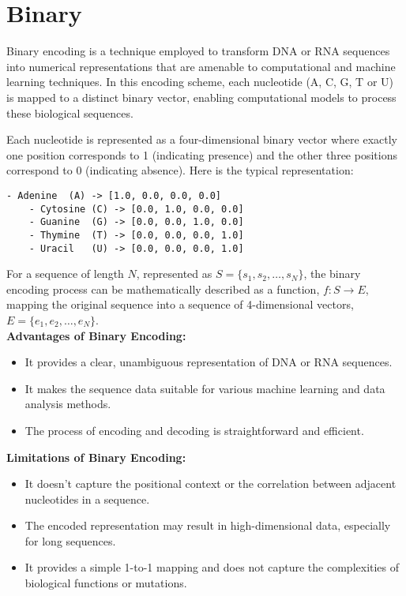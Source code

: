\section{Binary}
Binary encoding is a technique employed to transform DNA or RNA sequences into 
numerical representations that are amenable to computational and machine learning 
techniques. In this encoding scheme, each nucleotide (A, C, G, T or U) is mapped 
to a distinct binary vector, enabling computational models to process these biological 
sequences.

Each nucleotide is represented as a four-dimensional binary vector where exactly 
one position corresponds to 1 (indicating presence) and the other three positions 
correspond to 0 (indicating absence). Here is the typical representation:

\begin{lstlisting}[basicstyle=\ttfamily]
    - Adenine  (A) -> [1.0, 0.0, 0.0, 0.0]
    - Cytosine (C) -> [0.0, 1.0, 0.0, 0.0]
    - Guanine  (G) -> [0.0, 0.0, 1.0, 0.0]
    - Thymine  (T) -> [0.0, 0.0, 0.0, 1.0]
    - Uracil   (U) -> [0.0, 0.0, 0.0, 1.0]
\end{lstlisting}

\noindent
For a sequence of length $N$, represented as $S = \{s_1, s_2, \ldots, s_N\}$, the 
binary encoding process can be mathematically described as a function, 
$f: S \rightarrow E$, mapping the original sequence into a sequence of 
4-dimensional vectors, $E = \{e_1, e_2, \ldots, e_N\}$.\\

\noindent
\textbf{Advantages of Binary Encoding:}
\begin{itemize}
  \item It provides a clear, unambiguous representation of DNA or RNA sequences.
  \item It makes the sequence data suitable for various machine learning and data
  analysis methods.
  
  \item The process of encoding and decoding is straightforward and efficient.
\end{itemize}

\noindent
\textbf{Limitations of Binary Encoding:}
\begin{itemize}
  \item It doesn't capture the positional context or the correlation between 
  adjacent nucleotides in a sequence.
  \item The encoded representation may result in high-dimensional data, especially
   for long sequences.
  \item It provides a simple 1-to-1 mapping and does not capture the complexities
   of biological functions or mutations.
\end{itemize}

